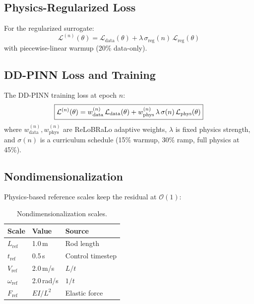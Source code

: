 \documentclass[11pt]{article}
\begin{document}
\subsection{Physics-Regularized Loss}
\label{sec:pinn:reg-loss}

For the regularized surrogate:
\begin{equation}
  \mathcal{L}^{(n)}(\theta) = \mathcal{L}_{\mathrm{data}}(\theta) + \lambda\,\sigma_{\mathrm{reg}}(n)\,\mathcal{L}_{\mathrm{reg}}(\theta)
  \label{eq:pinn:reg-total-loss}
\end{equation}
with piecewise-linear warmup (20\% data-only).

\subsection{DD-PINN Loss and Training}
\label{sec:pinn:ddpinn-training}

The DD-PINN training loss at epoch $n$:
\begin{equation}
  \boxed{%
    \mathcal{L}^{(n)}(\theta) = w_{\mathrm{data}}^{(n)}\,\mathcal{L}_{\mathrm{data}}(\theta)
    + w_{\mathrm{phys}}^{(n)}\,\lambda\,\sigma(n)\,\mathcal{L}_{\mathrm{phys}}(\theta)
  }
  \label{eq:pinn:ddpinn-total}
\end{equation}
where $w_{\mathrm{data}}^{(n)}, w_{\mathrm{phys}}^{(n)}$ are ReLoBRaLo \citep{Bischof2022} adaptive weights, $\lambda$ is fixed physics strength, and $\sigma(n)$ is a curriculum schedule (15\% warmup, 30\% ramp, full physics at 45\%).

\subsection{Nondimensionalization}
\label{sec:pinn:nondim}

Physics-based reference scales keep the residual at $\mathcal{O}(1)$:

\begin{table}[H]
  \centering
  \small
  \caption{Nondimensionalization scales.}
  \label{tab:pinn-nondim}
  \begin{tabular}{@{}lll@{}}
    \toprule
    \textbf{Scale} & \textbf{Value} & \textbf{Source} \\
    \midrule
    $L_{\mathrm{ref}}$ & 1.0\,m & Rod length \\
    $t_{\mathrm{ref}}$ & 0.5\,s & Control timestep \\
    $V_{\mathrm{ref}}$ & 2.0\,m/s & $L/t$ \\
    $\omega_{\mathrm{ref}}$ & 2.0\,rad/s & $1/t$ \\
    $F_{\mathrm{ref}}$ & $EI/L^2$ & Elastic force \\
    \bottomrule
  \end{tabular}
\end{table}
\end{document}
